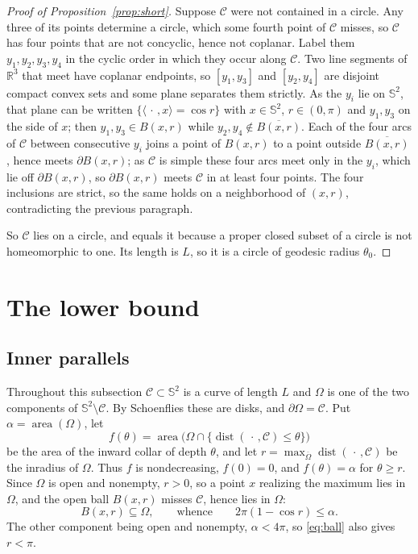 \documentclass[11pt,oneside,reqno]{amsart}
\theoremstyle{plain}
\theoremstyle{definition}
\DeclareMathOperator{\dist}{dist}
\DeclareMathOperator{\area}{area}
\newcommand{\Sph}{\mathbb{S}^{2}}
\newcommand{\R}{\mathbb{R}}
\begin{document}
\begin{proof}[Proof of Proposition~\ref{prop:short}]
Suppose $\mathcal{C}$ were not contained in a circle. Any three of its points
determine a circle, which some fourth point of $\mathcal{C}$ misses, so
$\mathcal{C}$ has four points that are not concyclic, hence not coplanar.
Label them $y_{1},y_{2},y_{3},y_{4}$ in the cyclic order in which they occur
along $\mathcal{C}$. Two line segments of $\R^{3}$ that meet have coplanar
endpoints, so $[y_{1},y_{3}]$ and $[y_{2},y_{4}]$ are disjoint compact convex
sets and some plane separates them strictly. As the $y_{i}$ lie on $\Sph$, that
plane can be written $\{\langle\,\cdot\,,x\rangle=\cos r\}$ with $x\in\Sph$,
$r\in(0,\pi)$ and $y_{1},y_{3}$ on the side of $x$; then
$y_{1},y_{3}\in B(x,r)$ while $y_{2},y_{4}\notin\overline{B(x,r)}$. Each of the
four arcs of $\mathcal{C}$ between consecutive $y_{i}$ joins a point of
$B(x,r)$ to a point outside $\overline{B(x,r)}$, hence meets
$\partial B(x,r)$; as $\mathcal{C}$ is simple these four arcs meet only in the
$y_{i}$, which lie off $\partial B(x,r)$, so $\partial B(x,r)$ meets
$\mathcal{C}$ in at least four points. The four inclusions are strict, so the
same holds on a neighborhood of $(x,r)$, contradicting the previous paragraph.

So $\mathcal{C}$ lies on a circle, and equals it because a proper closed subset
of a circle is not homeomorphic to one. Its length is $L$, so it is a circle of
geodesic radius $\theta_{0}$.
\end{proof}

\section{The lower bound}\label{sec:bound}

\subsection{Inner parallels}\label{ssec:parallels}

Throughout this subsection $\mathcal{C}\subset\Sph$ is a curve of length $L$
and $\Omega$ is one of the two components of $\Sph\setminus\mathcal{C}$. By
Schoenflies these are disks, and $\partial\Omega=\mathcal{C}$. Put
$\alpha=\area(\Omega)$, let
\begin{equation}\label{eq:f}
  f(\theta)=\area\bigl(\Omega\cap\{\dist(\,\cdot\,,\mathcal{C})\le\theta\}\bigr)
\end{equation}
be the area of the inward collar of depth $\theta$, and let
$r=\max_{\overline{\Omega}}\dist(\,\cdot\,,\mathcal{C})$ be the inradius of
$\Omega$. Thus $f$ is nondecreasing, $f(0)=0$, and $f(\theta)=\alpha$ for
$\theta\ge r$. Since $\Omega$ is open and nonempty, $r>0$, so a point $x$
realizing the maximum lies in $\Omega$, and the open ball $B(x,r)$ misses
$\mathcal{C}$, hence lies in $\Omega$:
\begin{equation}\label{eq:ball}
  B(x,r)\subseteq\Omega,\qquad\text{whence}\qquad 2\pi(1-\cos r)\le\alpha .
\end{equation}
The other component being open and nonempty, $\alpha<4\pi$, so \eqref{eq:ball}
also gives $r<\pi$.
\end{document}
